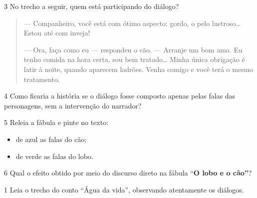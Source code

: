 \num{3} No trecho a seguir, quem está participando do diálogo?

\begin{quote}
--- Companheiro, você está com ótimo aspecto: gordo, o pelo
lustroso\ldots{} Estou até com inveja!

--- Ora, faça como eu --- respondeu o cão. --- Arranje um bom amo. Eu
tenho comida na hora certa, sou bem tratado\ldots{} Minha única
obrigação é latir à noite, quando aparecem ladrões. Venha comigo e você
terá o mesmo tratamento.
\end{quote}


\pagebreak
\num{4} Como ficaria a história se o diálogo fosse composto apenas pelas falas
das personagens, sem a intervenção do narrador?



\num{5} Releia a fábula e pinte no texto:

\begin{itemize}
\item de azul as falas do cão;

\item de verde as falas do lobo.
\end{itemize}

\num{6} Qual o efeito obtido por meio do discurso direto na fábula ``\textbf{O lobo e o cão''}?



\num{1} Leia o trecho do conto ``Água da vida'', observando atentamente 
os diálogos.


